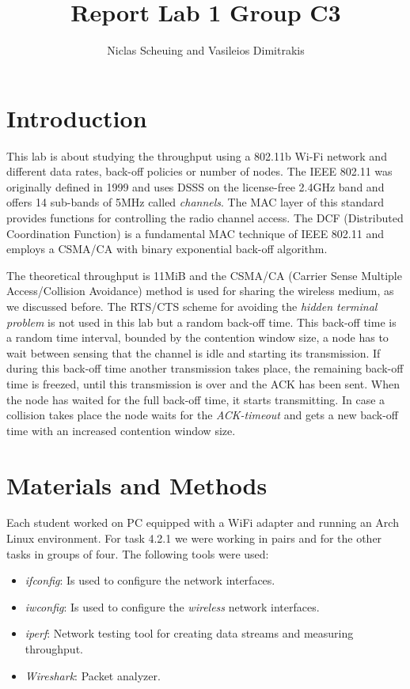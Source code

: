 \documentclass[12pt,a4paper]{article}
\title{Report Lab 1 Group C3}
\author{Niclas Scheuing and Vasileios Dimitrakis}
\begin{document}
\maketitle
\section{Introduction}
This lab is about studying the throughput using a 802.11b Wi-Fi network and different data rates, back-off policies or number of nodes.
The IEEE 802.11\cite{802b:wiki} was originally defined in 1999 and uses DSSS on the license-free 2.4GHz band and offers 14 sub-bands of 5MHz called \emph{channels}.
The MAC layer of this standard provides functions for controlling the radio channel access.
The DCF (Distributed Coordination Function\cite{wiki:dcf}) is a fundamental MAC technique of IEEE 802.11 and employs a CSMA/CA with binary exponential back-off algorithm.

The theoretical throughput is 11MiB and the CSMA/CA (Carrier Sense Multiple Access/Collision Avoidance) method is used for sharing the wireless medium, as we discussed before.
The RTS/CTS scheme for avoiding the \emph{hidden terminal problem} is not used in this lab but a random back-off time. This back-off time is a random time interval, bounded by the contention window size, a node has to wait between sensing that the channel is idle and starting its transmission.
If during this back-off time another transmission takes place, the remaining back-off time is freezed, until this transmission is over and the ACK has been sent.
When the node has waited for the full back-off time, it starts transmitting. In case a collision takes place the node waits for the \emph{ACK-timeout} and gets a new back-off time with an increased contention window size.

\section{Materials and Methods}
Each student worked on PC equipped with a WiFi adapter and running an Arch Linux environment.
For task 4.2.1 we were working in pairs and for the other tasks in groups of four.
The following tools were used:
\begin{itemize}

\item \emph{ifconfig}: Is used to configure the network interfaces.
\item \emph{iwconfig}: Is used to configure the \emph{wireless} network interfaces.
\item \emph{iperf}: Network testing tool for creating data streams and measuring throughput.
\item \emph{Wireshark}: Packet analyzer.
\end{itemize}
\end{document}

